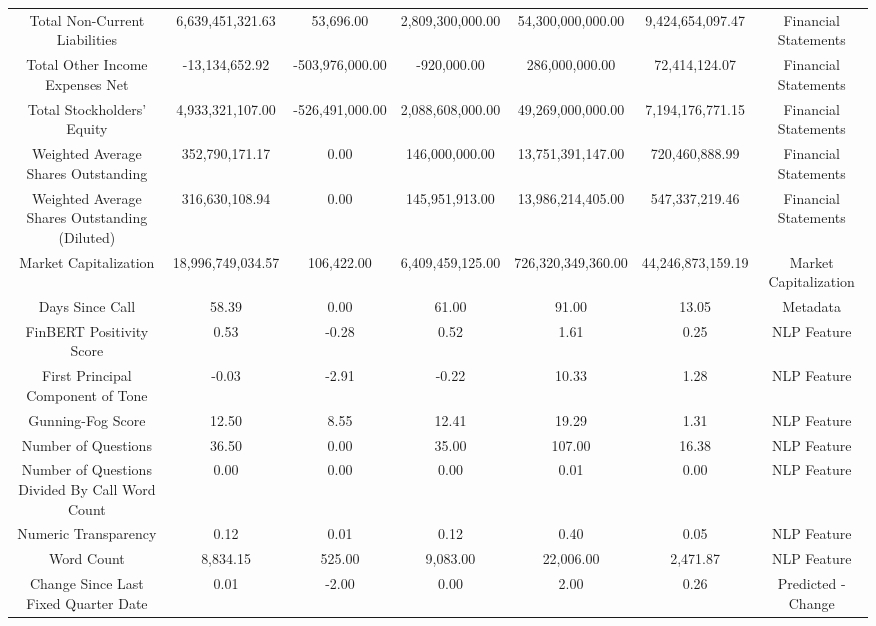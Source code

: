 \begin{longtable}{ccccccc}
Total Non-Current Liabilities & 6,639,451,321.63 & 53,696.00 & 2,809,300,000.00 & 54,300,000,000.00 & 9,424,654,097.47 & Financial Statements \\
Total Other Income Expenses Net & -13,134,652.92 & -503,976,000.00 & -920,000.00 & 286,000,000.00 & 72,414,124.07 & Financial Statements \\
Total Stockholders' Equity & 4,933,321,107.00 & -526,491,000.00 & 2,088,608,000.00 & 49,269,000,000.00 & 7,194,176,771.15 & Financial Statements \\
Weighted Average Shares Outstanding & 352,790,171.17 & 0.00 & 146,000,000.00 & 13,751,391,147.00 & 720,460,888.99 & Financial Statements \\
Weighted Average Shares Outstanding (Diluted) & 316,630,108.94 & 0.00 & 145,951,913.00 & 13,986,214,405.00 & 547,337,219.46 & Financial Statements \\
Market Capitalization & 18,996,749,034.57 & 106,422.00 & 6,409,459,125.00 & 726,320,349,360.00 & 44,246,873,159.19 & Market Capitalization \\
Days Since Call & 58.39 & 0.00 & 61.00 & 91.00 & 13.05 & Metadata \\
FinBERT Positivity Score & 0.53 & -0.28 & 0.52 & 1.61 & 0.25 & NLP Feature \\
First Principal Component of Tone & -0.03 & -2.91 & -0.22 & 10.33 & 1.28 & NLP Feature \\
Gunning-Fog Score & 12.50 & 8.55 & 12.41 & 19.29 & 1.31 & NLP Feature \\
Number of Questions & 36.50 & 0.00 & 35.00 & 107.00 & 16.38 & NLP Feature \\
Number of Questions Divided By Call Word Count & 0.00 & 0.00 & 0.00 & 0.01 & 0.00 & NLP Feature \\
Numeric Transparency & 0.12 & 0.01 & 0.12 & 0.40 & 0.05 & NLP Feature \\
Word Count & 8,834.15 & 525.00 & 9,083.00 & 22,006.00 & 2,471.87 & NLP Feature \\
Change Since Last Fixed Quarter Date & 0.01 & -2.00 & 0.00 & 2.00 & 0.26 & Predicted - Change \\
\end{longtable}

\normalsize